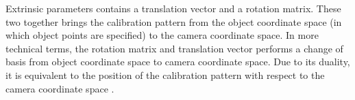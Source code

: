 \documentclass[a4paper,12pt]{report}
\begin{document}
\begin{appendices}
\begin{enumerate}
		Extrinsic parameters contains a translation vector and a rotation matrix. These two together brings the calibration pattern from the object coordinate space (in which object points are specified) to the camera coordinate space. In more technical terms, the rotation matrix and translation vector performs a change of basis from object coordinate space to camera coordinate space. Due to its duality, it is equivalent to the position of the calibration pattern with respect to the camera coordinate space \cite{backproject:_nodate-1}.\\
		
		\begin{figure}[h]
			\centering
\end{figure}
\end{enumerate}
\end{appendices}
\end{document}
